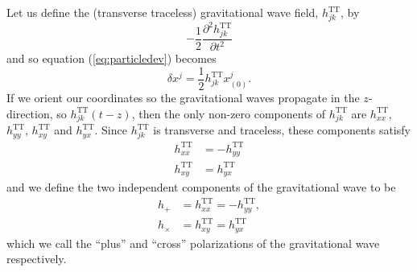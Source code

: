 Let us define the (transverse traceless) gravitational wave field,
$h_{jk}^\mathrm{TT}$, by
\begin{equation}
-\frac{1}{2} \frac{\partial^2 h_{jk}^\mathrm{TT}}{\partial t^2}
\end{equation}
and so equation (\ref{eq:particledev}) becomes
\begin{equation}
\delta x^j = \frac{1}{2} h_{jk}^\mathrm{TT} x_{(0)}^j.
\end{equation}
If we orient our coordinates so the gravitational waves propagate in the
$z$-direction, so $h_{jk}^\mathrm{TT}(t-z)$, then the only non-zero components
of $h_{jk}^\mathrm{TT}$ are $h_{xx}^\mathrm{TT}$, $h_{yy}^\mathrm{TT}$,
$h_{xy}^\mathrm{TT}$ and $h_{yx}^\mathrm{TT}$. Since $h_{jk}^\mathrm{TT}$ is
transverse and traceless, these components satisfy
\begin{align}
h_{xx}^\mathrm{TT} &= - h_{yy}^\mathrm{TT} \\
h_{xy}^\mathrm{TT} &= h_{yx}^\mathrm{TT}
\end{align}
and we define the two independent components of the gravitational wave to be
\begin{align}
h_{+} &= h_{xx}^\mathrm{TT} = - h_{yy}^\mathrm{TT}, \\
h_{\times} &= h_{xy}^\mathrm{TT} = h_{yx}^\mathrm{TT}
\end{align}
which we call the ``plus'' and ``cross'' polarizations of the gravitational
wave respectively.

